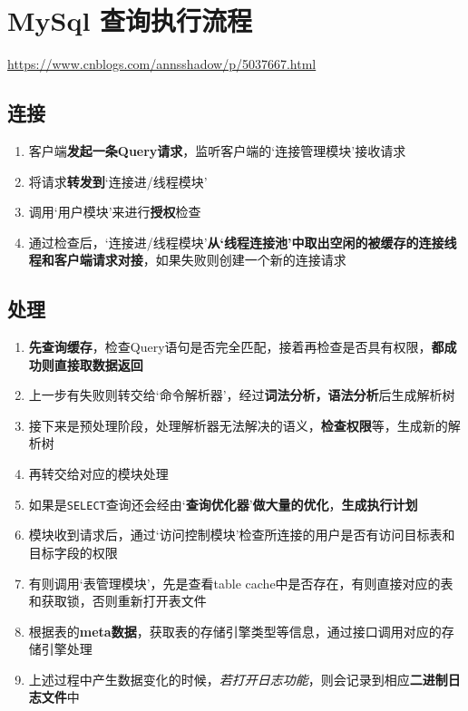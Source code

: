 \documentclass[UTF8,a4paper,12pt]{ctexbook}
\begin{document}
	\section{MySql 查询执行流程}
		\url{https://www.cnblogs.com/annsshadow/p/5037667.html}
			
		\subsection{连接}
			\begin{enumerate}
				\item 客户端\textbf{发起一条Query请求}，监听客户端的‘连接管理模块’接收请求
				\item 将请求\textbf{转发到}‘连接进/线程模块’
				\item 调用‘用户模块’来进行\textbf{授权}检查
				\item 通过检查后，‘连接进/线程模块’\textbf{从‘线程连接池’中取出空闲的被缓存的连接线程和客户端请求对接}，如果失败则创建一个新的连接请求
			\end{enumerate}
		
		\subsection{处理}
			\begin{enumerate}
				\item \textbf{先查询缓存}，检查Query语句是否完全匹配，接着再检查是否具有权限，\textbf{都成功则直接取数据返回}
				\item 上一步有失败则转交给‘命令解析器’，经过\textbf{词法分析，语法分析}后生成解析树
				\item 接下来是预处理阶段，处理解析器无法解决的语义，\textbf{检查权限}等，生成新的解析树
				\item 再转交给对应的模块处理
				\item 如果是\verb|SELECT|查询还会经由‘\textbf{查询优化器}’\textbf{做大量的优化}，\textbf{生成执行计划}
				\item 模块收到请求后，通过‘访问控制模块’检查所连接的用户是否有访问目标表和目标字段的权限
				\item 有则调用‘表管理模块’，先是查看table cache中是否存在，有则直接对应的表和获取锁，否则重新打开表文件
				\item 根据表的\textbf{meta数据}，获取表的存储引擎类型等信息，通过接口调用对应的存储引擎处理
				\item 上述过程中产生数据变化的时候，\textit{若打开日志功能}，则会记录到相应\textbf{二进制日志文件}中
			\end{enumerate}
		
\end{document}
